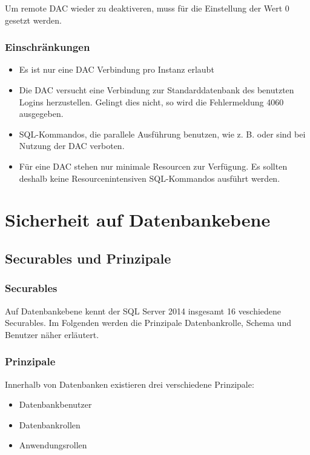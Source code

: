         Um remote DAC wieder zu deaktiveren, muss für die Einstellung
         der Wert 0 gesetzt werden.
        \begin{literaturinternet}
          \item \cite{ms190468}
        \end{literaturinternet}
        \subsubsection{Einschränkungen}
          \begin{itemize}
            \item Es ist nur eine DAC Verbindung pro Instanz erlaubt
            \item Die DAC versucht eine Verbindung zur Standarddatenbank des
            benutzten Logins herzustellen. Gelingt dies nicht, so wird die
            Fehlermeldung 4060 ausgegeben.
            \item SQL-Kommandos, die parallele Ausführung benutzen, wie z. B.
             oder  sind bei Nutzung
            der DAC verboten.
            \item Für eine DAC stehen nur minimale Resourcen zur Verfügung. Es
            sollten deshalb keine Resourcenintensiven SQL-Kommandos ausführt
            werden.
          \end{itemize}      
    \section{Sicherheit auf Datenbankebene}
      \subsection{Securables und Prinzipale}
        \subsubsection{Securables}
          Auf Datenbankebene kennt der SQL Server 2014 insgesamt 16 veschiedene
          Securables. Im Folgenden werden die Prinzipale Datenbankrolle,
          Schema und Benutzer näher erläutert.
          \begin{literaturinternet}
            \item \cite{ms190401}
          \end{literaturinternet}
        \subsubsection{Prinzipale}
          Innerhalb von Datenbanken existieren drei verschiedene Prinzipale:
          \begin{itemize}
            \item Datenbankbenutzer
            \item Datenbankrollen
            \item Anwendungsrollen
          \end{itemize}
